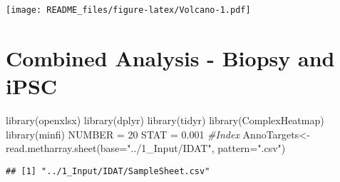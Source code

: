 \documentclass[
  10pt,
]{article}
\newenvironment{Shaded}{\begin{snugshade}}{\end{snugshade}}
\newcommand{\AttributeTok}[1]{\textcolor[rgb]{0.77,0.63,0.00}{#1}}
\newcommand{\CommentTok}[1]{\textcolor[rgb]{0.56,0.35,0.01}{\textit{#1}}}
\newcommand{\DecValTok}[1]{\textcolor[rgb]{0.00,0.00,0.81}{#1}}
\newcommand{\FloatTok}[1]{\textcolor[rgb]{0.00,0.00,0.81}{#1}}
\newcommand{\FunctionTok}[1]{\textcolor[rgb]{0.00,0.00,0.00}{#1}}
\newcommand{\NormalTok}[1]{#1}
\newcommand{\OtherTok}[1]{\textcolor[rgb]{0.56,0.35,0.01}{#1}}
\newcommand{\StringTok}[1]{\textcolor[rgb]{0.31,0.60,0.02}{#1}}
\begin{document}
\texttt{[image: README\_files/figure-latex/Volcano-1.pdf]}

\hypertarget{combined-analysis---biopsy-and-ipsc}{%
\section{Combined Analysis - Biopsy and
iPSC}\label{combined-analysis---biopsy-and-ipsc}}

\begin{Shaded}
\begin{Highlighting}[]
\FunctionTok{library}\NormalTok{(openxlsx)}
\FunctionTok{library}\NormalTok{(dplyr)}
\FunctionTok{library}\NormalTok{(tidyr)}
\FunctionTok{library}\NormalTok{(ComplexHeatmap)}
\FunctionTok{library}\NormalTok{(minfi)}
\NormalTok{NUMBER }\OtherTok{=} \DecValTok{20}
\NormalTok{STAT }\OtherTok{=} \FloatTok{0.001}
\CommentTok{\#Index}
\NormalTok{AnnoTargets}\OtherTok{\textless{}{-}}\FunctionTok{read.metharray.sheet}\NormalTok{(}\AttributeTok{base=}\StringTok{"../1\_Input/IDAT"}\NormalTok{, }\AttributeTok{pattern=}\StringTok{".csv"}\NormalTok{)}
\end{Highlighting}
\end{Shaded}

\begin{verbatim}
## [1] "../1_Input/IDAT/SampleSheet.csv"
\end{verbatim}
\end{document}
